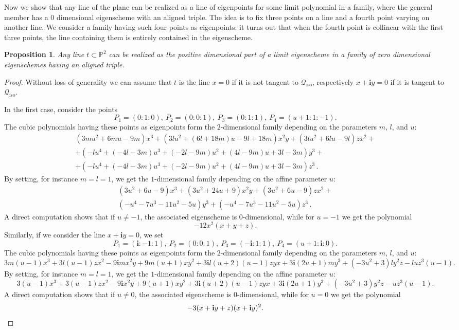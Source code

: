\documentclass{amsart}
\theoremstyle{plain}
\newtheorem{prop}[lemma]{Proposition}
\theoremstyle{definition}
\newcommand{\p}{\mathbb{P}}
\newcommand{\iso}{\mathcal{Q}_{\mathrm{iso}}}
\newcommand{\iii}{\textbf{i}}
\begin{document}
\medskip
Now we show that any line of the plane can be realized as a line of eigenpoints for some limit polynomial in a family, where the general member has a $0$ dimensional eigenscheme with an aligned triple. The idea is to fix three points on a line and a fourth point varying on another line. We consider a family having such four points as eigenpoints; it turns out that when the fourth point is collinear with the first three points, the line containing them is entirely contained in the eigenscheme.

\begin{prop}
\label{prop:line_as_limit}
    Any line $t \subset \p^2$ can be realized as the positive dimensional part of a limit eigenscheme in a  family of zero dimensional eigenschemes having an aligned triple.
\end{prop}

\begin{proof}
    Without loss of generality we can assume that $t$ is the line $x=0$ if it is not tangent to $\iso$, respectively $x+\iii y=0$ if it is tangent to $\iso$.

    In the first case, consider the points
    \[
    P_1=(0:1:0), \ P_2=(0:0:1), \ P_3=(0:1:1), \ P_4=(u+1:1:-1).
    \]
    The cubic polynomials having these points as eigenpoints form the $2$-dimensional family depending on the parameters $m$, $l$, and $u$:
    \begin{multline*}
    (3mu^2 + 6mu - 9m) x^3 + (3 l u^2+(6l + 18m)u - 9l + 18m) x^2 y + (3lu^2 + 6lu - 9l) z x^2 + \\
    +(-l u^4+(-4 l-3 m) u^3+(-2 l-9 m) u^2+(4 l-9 m) u + 3 l-3 m) y^3+ \\
    +(-l u^4 + (-4 l-3 m)u^3 + (-2l - 9m) u^2 + (4l - 9m)u + 3l - 3m) z^3 \,.
    \end{multline*}
    By setting, for instance $m=l=1$, we get the $1$-dimensional family depending on the affine parameter $u$:
    \begin{multline*}
    (3 u^2+6 u-9) x^3+(3 u^2+24 u+9) x^2 y+(3 u^2+6 u-9) z x^2+\\
    (-u^4-7 u^3-11 u^2-5 u) y^3+(-u^4-7 u^3-11 u^2-5 u) z^3 \,.
    \end{multline*}
    A direct computation shows that if $u \neq -1$, the associated eigenscheme is $0$-dimensional, while for $u=-1$ we get the polynomial
    \[
     -12 x^2 (x+ y+ z).
    \]
    Similarly, if we consider the line $x+\iii y=0$, we set
    \[
    P_1=(\iii:-1:1), \ P_2=(0:0:1), \ P_3=(-\iii:1:1), \ P_4=(u+1: \iii:0).
    \]
    The cubic polynomials having these points as eigenpoints form the $2$-dimensional family depending on the parameters $m$, $l$, and $u$:
$$
3m(u-1)x^3+3l(u-1)zx^2-9\iii mx^2y+9m(u+1) xy^2+3 \iii l(u+2)(u-1)zyx+3\iii (2u+1)my^3+(-3u^2+3)ly^2 z-l u z^3 (u-1).
$$
By setting, for instance $m=l=1$, we get the $1$-dimensional family depending on the affine parameter $u$:
$$
3(u-1)x^3+3(u-1)zx^2-9\iii x^2y+9(u+1) xy^2+3 \iii (u+2)(u-1)zyx+3\iii (2u+1)y^3+(-3u^2+3)y^2 z- u z^3 (u-1).
$$
A direct computation shows that if $u \neq 0$, the associated eigenscheme is $0$-dimensional, while for $u=0$ we get the polynomial
\[
-3(x+\iii y+z)(x+\iii y)^2. \qedhere
\]
\end{proof}
\end{document}
